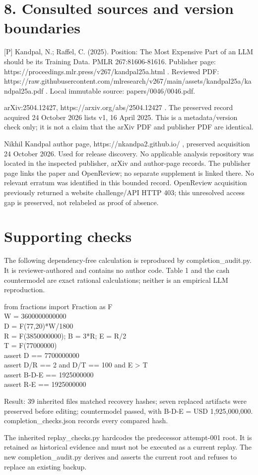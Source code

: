 \documentclass[10pt]{article}
\begin{document}
\section*{8. Consulted sources and version boundaries}
[P] Kandpal, N.; Raffel, C. (2025). Position: The Most Expensive Part of an LLM should be its Training Data. PMLR 267:81606-81616. Publisher page: https://proceedings.mlr.press/v267/kandpal25a.html . Reviewed PDF: https://raw.githubusercontent.com/mlresearch/v267/main/assets/kandpal25a/kandpal25a.pdf . Local immutable source: papers/0046/0046.pdf.\par
[A] arXiv:2504.12427, https://arxiv.org/abs/2504.12427 . The preserved record acquired 24 October 2026 lists v1, 16 April 2025. This is a metadata/version check only; it is not a claim that the arXiv PDF and publisher PDF are identical.\par
[W] Nikhil Kandpal author page, https://nkandpa2.github.io/ , preserved acquisition 24 October 2026. Used for release discovery. No applicable analysis repository was located in the inspected publisher, arXiv and author-page records. The publisher page links the paper and OpenReview; no separate supplement is linked there. No relevant erratum was identified in this bounded record. OpenReview acquisition previously returned a website challenge/API HTTP 403; this unresolved access gap is preserved, not relabeled as proof of absence.\par
\section*{Supporting checks}
The following dependency-free calculation is reproduced by completion\_audit.py. It is reviewer-authored and contains no author code. Table 1 and the cash countermodel are exact rational calculations; neither is an empirical LLM reproduction.\par
{\ttfamily\footnotesize from fractions import Fraction as F\\
W = 3600000000000\\
D = F(77,20)*W/1800\\
R = F(3850000000); B = 3*R; E = R/2\\
T = F(77000000)\\
assert D == 7700000000\\
assert D/R == 2 and D/T == 100 and E > T\\
assert B-D-E == 1925000000\\
assert R-E == 1925000000}\par
Result: 39 inherited files matched recovery hashes; seven replaced artifacts were preserved before editing; countermodel passed, with B-D-E = USD 1,925,000,000. completion\_checks.json records every compared hash.\par
The inherited replay\_checks.py hardcodes the predecessor attempt-001 root. It is retained as historical evidence and must not be executed as a current replay. The new completion\_audit.py derives and asserts the current root and refuses to replace an existing backup.\par
\end{document}
